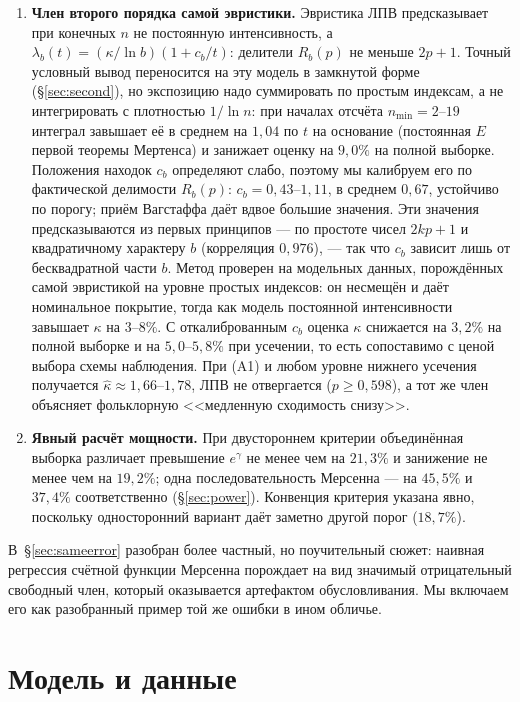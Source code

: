 \documentclass[11pt,a4paper]{article}
\theoremstyle{plain}
\theoremstyle{remark}
\newcommand{\Rb}{R_b}
\newcommand{\eg}{e^{\gamma}}
\begin{document}
\begin{enumerate}
\item\textbf{Член второго порядка самой эвристики.} Эвристика ЛПВ предсказывает
при конечных $n$ не постоянную интенсивность, а
$\lambda_b(t)=(\kappa/\ln b)(1+c_b/t)$: делители $\Rb(p)$ не меньше $2p+1$.
Точный условный вывод переносится на эту модель в замкнутой форме
(\S\ref{sec:second}), но экспозицию надо суммировать по простым индексам, а не
интегрировать с плотностью $1/\ln n$: при началах отсчёта $n_{\min}=2$--$19$
интеграл завышает её в среднем на $1{,}04$ по $t$ на основание (постоянная $E$
первой теоремы Мертенса) и занижает оценку на $9{,}0\%$ на полной выборке.
Положения находок $c_b$ определяют слабо, поэтому мы
калибруем его по фактической делимости $\Rb(p)$: $c_b=0{,}43$--$1{,}11$, в
среднем $0{,}67$, устойчиво по порогу; приём Вагстаффа даёт вдвое большие
значения. Эти значения предсказываются из первых принципов --- по простоте чисел
$2kp+1$ и квадратичному характеру $b$ (корреляция $0{,}976$), --- так что $c_b$
зависит лишь от бесквадратной части $b$. Метод проверен на модельных данных,
порождённых самой эвристикой на уровне простых индексов: он несмещён и даёт
номинальное покрытие, тогда как модель постоянной интенсивности завышает
$\kappa$ на $3$--$8\%$. С откалиброванным $c_b$ оценка $\kappa$ снижается на
$3{,}2\%$ на полной выборке и на $5{,}0$--$5{,}8\%$ при усечении, то есть
сопоставимо с ценой выбора схемы наблюдения. При (A1) и любом уровне нижнего
усечения получается $\hat\kappa\approx1{,}66$--$1{,}78$, ЛПВ не отвергается
($p\ge0{,}598$), а тот же член объясняет фольклорную <<медленную
сходимость снизу>>.

\item\textbf{Явный расчёт мощности.} При двустороннем критерии объединённая
выборка различает превышение $\eg$ не менее чем на $21{,}3\%$ и занижение не
менее чем на $19{,}2\%$; одна последовательность Мерсенна --- на $45{,}5\%$ и
$37{,}4\%$ соответственно (\S\ref{sec:power}).
Конвенция критерия указана явно, поскольку односторонний вариант даёт
заметно другой порог ($18{,}7\%$).
\end{enumerate}

В~\S\ref{sec:sameerror} разобран более частный, но поучительный сюжет: наивная регрессия
счётной функции Мерсенна порождает на вид значимый отрицательный свободный член,
который оказывается артефактом обусловливания. Мы включаем его как разобранный пример
той же ошибки в ином обличье.

\section{Модель и данные}\label{sec:data}
\end{document}
